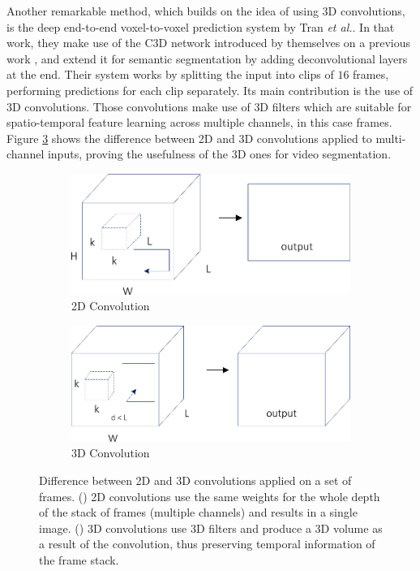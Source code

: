 Another remarkable method, which builds on the idea of using 3D convolutions, is the deep end-to-end voxel-to-voxel prediction system by Tran \emph{et al.}\cite{Tran2016}. In that work, they make use of the \ac{C3D} network introduced by themselves on a previous work \cite{Tran2015}, and extend it for semantic segmentation by adding deconvolutional layers at the end. Their system works by splitting the input into clips of $16$ frames, performing predictions for each clip separately. Its main contribution is the use of 3D convolutions. Those convolutions make use of \acl{3D} filters which are suitable for spatio-temporal feature learning across multiple channels, in this case frames. Figure \ref{fig:semseg:2dvs3dconvolutions} shows the difference between 2D and 3D convolutions applied to multi-channel inputs, proving the usefulness of the 3D ones for video segmentation.

\begin{figure}[!hbt]
	\centering
	\begin{subfigure}{0.49\linewidth}
		\includegraphics[width=\linewidth]{Figures/Segmentation/2dconvolutionframes.eps}
		\caption{2D Convolution}
		\label{fig:2dvs3dconvolutions:2dconvolution}
	\end{subfigure}
	\hfill
	\begin{subfigure}{0.49\linewidth}
		\includegraphics[width=\linewidth]{Figures/Segmentation/3dconvolution.eps}
		\caption{3D Convolution}
		\label{fig:2dvs3dconvolutions:3dconvolution}
	\end{subfigure}
	\caption{Difference between 2D and 3D convolutions applied on a set of frames. (\protect{}) 2D convolutions use the same weights for the whole depth of the stack of frames (multiple channels) and results in a single image. (\protect{}) 3D convolutions use 3D filters and produce a 3D volume as a result of the convolution, thus preserving temporal information of the frame stack.}
	\label{fig:semseg:2dvs3dconvolutions}
\end{figure}

